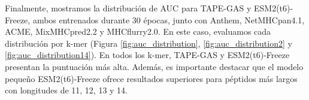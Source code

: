 Finalmente, mostramos la distribución de AUC para TAPE-GAS y ESM2(t6)-Freeze, ambos entrenados durante 30 épocas, junto con Anthem, NetMHCpan4.1, ACME, MixMHCpred2.2 y MHCflurry2.0. En este caso, evaluamos cada distribución por k-mer (Figura \ref{fig:auc_distribution}, \ref{fig:auc_distribution2} y \ref{fig:auc_distribution14}). En todos los k-mer, TAPE-GAS y ESM2(t6)-Freeze presentan la puntuación más alta. Además, es importante destacar que el modelo pequeño ESM2(t6)-Freeze ofrece resultados superiores para péptidos más largos con longitudes de 11, 12, 13 y 14.



\begin{figure}[H]
	\centering	

\end{figure}

